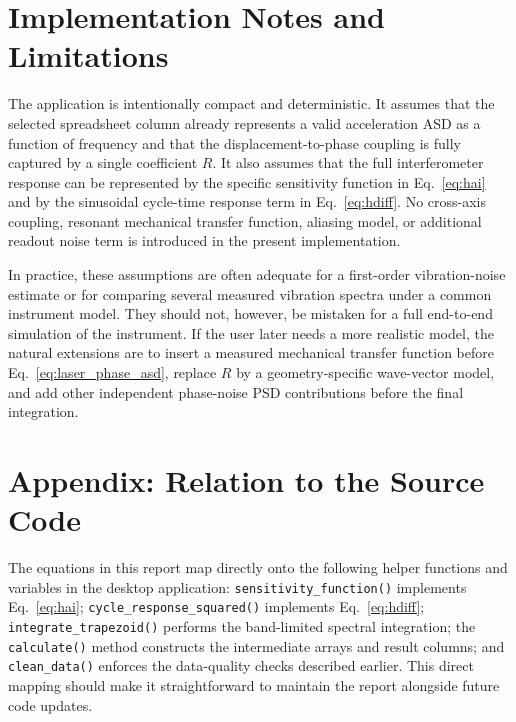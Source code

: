 \documentclass[11pt,a4paper]{report}
\begin{document}
\chapter{Implementation Notes and Limitations}

\begin{limitations}
The application is intentionally compact and deterministic. It assumes that the selected spreadsheet column already represents a valid acceleration ASD as a function of frequency and that the displacement-to-phase coupling is fully captured by a single coefficient $R$. It also assumes that the full interferometer response can be represented by the specific sensitivity function in Eq.~\eqref{eq:hai} and by the sinusoidal cycle-time response term in Eq.~\eqref{eq:hdiff}. No cross-axis coupling, resonant mechanical transfer function, aliasing model, or additional readout noise term is introduced in the present implementation.
\end{limitations}

In practice, these assumptions are often adequate for a first-order vibration-noise estimate or for comparing several measured vibration spectra under a common instrument model. They should not, however, be mistaken for a full end-to-end simulation of the instrument. If the user later needs a more realistic model, the natural extensions are to insert a measured mechanical transfer function before Eq.~\eqref{eq:laser_phase_asd}, replace $R$ by a geometry-specific wave-vector model, and add other independent phase-noise PSD contributions before the final integration.

\chapter*{Appendix: Relation to the Source Code}

The equations in this report map directly onto the following helper functions and variables in the desktop application: \texttt{sensitivity\_function()} implements Eq.~\eqref{eq:hai}; \texttt{cycle\_response\_squared()} implements Eq.~\eqref{eq:hdiff}; \texttt{integrate\_trapezoid()} performs the band-limited spectral integration; the \texttt{calculate()} method constructs the intermediate arrays and result columns; and \texttt{clean\_data()} enforces the data-quality checks described earlier. This direct mapping should make it straightforward to maintain the report alongside future code updates.
\end{document}
